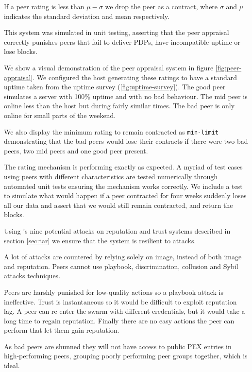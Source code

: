 \documentclass[11pt, a4paper, twoside]{report}
\def\code#1{\texttt{#1}}
\begin{document}
If a peer rating is less than $\mu - \sigma$ we drop the peer as a contract, where $\sigma$ and $\mu$ indicates the standard deviation and mean respectively.

This system was simulated in unit testing, asserting that the peer appraisal correctly punishes peers that fail to deliver PDPs, have incompatible uptime or lose blocks.

We show a visual demonstration of the peer appraisal system in figure \ref{fig:peer-appraisal}. We configured the host generating these ratings to have a standard uptime taken from the uptime survey (\ref{fig:uptime-survey}). The good peer simulates a server with 100\% uptime and with no bad behaviour. The mid peer is online less than the host but during fairly similar times. The bad peer is only online for small parts of the weekend.

We also display the minimum rating to remain contracted as \code{min-limit} demonstrating that the bad peers would lose their contracts if there were two bad peers, two mid peers and one good peer present.

The rating mechanism is performing exactly as expected. A myriad of test cases using peers with different characteristics are tested numerically through automated unit tests ensuring the mechanism works correctly. We include a test to simulate what would happen if a peer contracted for four weeks suddenly loses all our data and assert that we would still remain contracted, and return the blocks.

Using \cite{josang2009challenges}'s nine potential attacks on reputation and trust systems described in section \ref{sec:tar} we ensure that the system is resilient to attacks.

A lot of attacks are countered by relying solely on image, instead of both image and reputation. Peers cannot use playbook, discrimination, collusion and Sybil attacks techniques. 

Peers are harshly punished for low-quality actions so a playbook attack is ineffective. Trust is instantaneous so it would be difficult to exploit reputation lag. A peer can re-enter the swarm with different credentials, but it would take a long time to regain reputation. Finally there are no easy actions the peer can perform that let them gain reputation.

As bad peers are shunned they will not have access to public PEX entries in high-performing peers, grouping poorly performing peer groups together, which is ideal.
\end{document}

